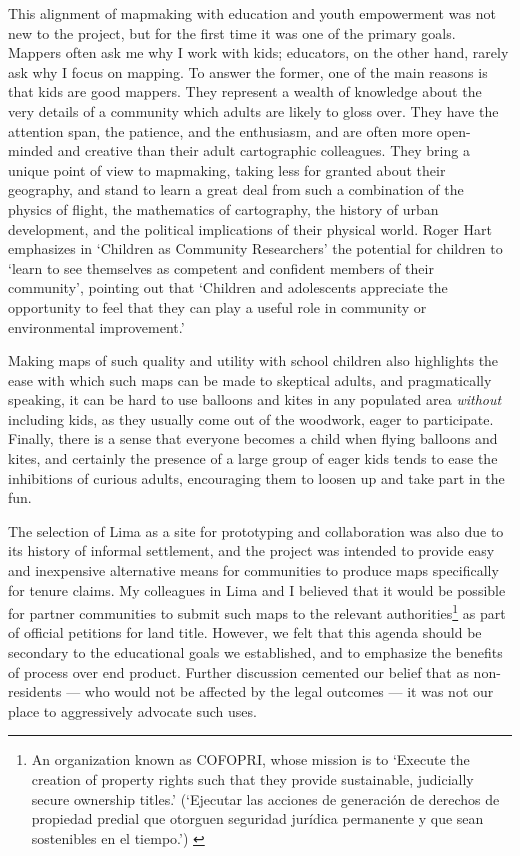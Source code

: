 \documentclass[11pt,oneside,notitlepage]{report}
\begin{document}
{{This alignment of mapmaking with education and youth empowerment was not new to the project, but for the first time it was one of the primary goals. Mappers often ask me why I work with kids; educators, on the other hand, rarely ask why I focus on mapping. To answer the former, one of the main reasons is that kids are good mappers. They represent a wealth of knowledge about the very details of a community which adults are likely to gloss over. They have the attention span, the patience, and the enthusiasm, and are often more open-minded and creative than their adult cartographic colleagues. They bring a unique point of view to mapmaking, taking less for granted about their geography, and stand to learn a great deal from such a combination of the physics of flight, the mathematics of cartography, the history of urban development, and the political implications of their physical world. Roger Hart emphasizes in `Children as Community Researchers' the potential for children to `learn to see themselves as competent and confident members of their community', pointing out that `Children and adolescents appreciate the opportunity to feel that they can play a useful role in community or environmental improvement.' \cite{hart2001children}

Making maps of such quality and utility with school children also highlights the ease with which such maps can be made to skeptical adults, and pragmatically speaking, it can be hard to use balloons and kites in any populated area \emph{without} including kids, as they usually come out of the woodwork, eager to participate. Finally, there is a sense that everyone becomes a child when flying balloons and kites, and certainly the presence of a large group of eager kids tends to ease the inhibitions of curious adults, encouraging them to loosen up and take part in the fun. 

The selection of Lima as a site for prototyping and collaboration was also due to its history of informal settlement, and the project was intended to provide easy and inexpensive alternative means for communities to produce maps specifically for tenure claims. My colleagues in Lima and I believed that it would be possible for partner communities to submit such maps to the relevant authorities\footnote{An organization known as \ac{COFOPRI}, whose mission is to `Execute the creation of property rights such that they provide sustainable, judicially secure ownership titles.' (`Ejecutar las acciones de generación de derechos de propiedad predial que otorguen seguridad jurídica permanente y que sean sostenibles en el tiempo.') \cite{cofopri2010mision}} as part of official petitions for land title. However, we felt that this agenda should be secondary to the educational goals we established, and to emphasize the benefits of process over end product. Further discussion cemented our belief that as non-residents --- who would not be affected by the legal outcomes --- it was not our place to aggressively advocate such uses. 

}}
\end{document}
